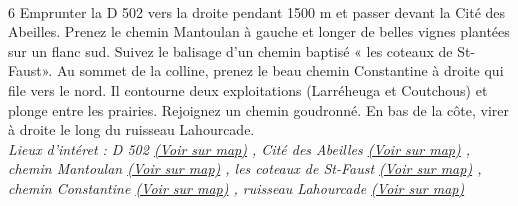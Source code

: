 \documentclass{article}
\begin{document}
        \paragraph{}
        6
                        Emprunter la D 502 vers la droite pendant 1500 m et passer devant la Cité des Abeilles. Prenez le chemin Mantoulan à gauche et longer de belles vignes plantées sur un flanc sud. Suivez le balisage d'un chemin baptisé « les coteaux de St-Faust». Au sommet de la colline, prenez le beau chemin Constantine à droite qui file vers le nord. Il contourne deux exploitations (Larréheuga et Coutchous) et plonge entre les prairies. Rejoignez un chemin goudronné. En bas de la côte, virer à droite le long du ruisseau Lahourcade.
                    \\
        \emph{Lieux d'intéret : D 502 
        \href{https://www.google.com/maps/?q=43.287530, -0.391115}{(Voir sur map)}
        , Cité des
                            Abeilles 
        \href{https://www.google.com/maps/?q=43.287530, -0.391115}{(Voir sur map)}
        , chemin
                            Mantoulan 
        \href{https://www.google.com/maps/?q=43.287530, -0.391115}{(Voir sur map)}
        , les coteaux de
                            St-Faust 
        \href{https://www.google.com/maps/?q=43.287530, -0.391115}{(Voir sur map)}
        , chemin
                            Constantine 
        \href{https://www.google.com/maps/?q=43.287530, -0.391115}{(Voir sur map)}
        , ruisseau
                            Lahourcade 
        \href{https://www.google.com/maps/?q=43.287530, -0.391115}{(Voir sur map)}
        }\\~\\
\end{document}
